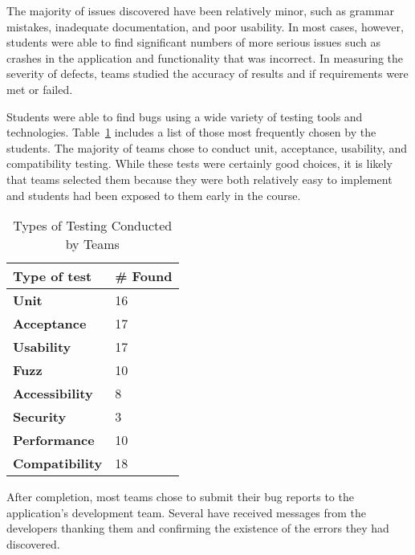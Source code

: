 \documentclass{sig-alternate}
\begin{document}
The majority of issues discovered have been relatively minor, such as grammar mistakes, inadequate documentation, and poor usability. In most cases, however, students were able to find significant numbers of more serious issues such as crashes in the application and functionality that was incorrect. In measuring the severity of defects, teams studied the accuracy of results and if requirements were met or failed.

Students were able to find bugs using a wide variety of testing tools and technologies. Table~\ref{table:typesoftesting} includes a list of those most frequently chosen by the students. The majority of teams chose to conduct unit, acceptance, usability, and compatibility testing. While these tests were certainly good choices, it is likely that teams selected them because they were both relatively easy to implement and students had been exposed to them early in the course.

\begin{table}[h!]
\caption{Types of Testing Conducted by Teams}
\begin{center}
    \begin{tabular}{ l | l }
    \toprule

	\bfseries Type of test & \bfseries \# Found  \\ \hline \hline
	\bfseries Unit & 16 \\ \hline
	\bfseries Acceptance & 17 \\ \hline
	\bfseries Usability & 17 \\ \hline
	\bfseries Fuzz & 10 \\ \hline
	\bfseries Accessibility & 8 \\ \hline
	\bfseries Security & 3 \\ \hline
	\bfseries Performance & 10 \\ \hline
	\bfseries Compatibility & 18 \\ \hline

    \end{tabular}
\end{center}

\label{table:typesoftesting}
\end{table}

After completion, most teams chose to submit their bug reports to the application's development team. Several have received messages from the developers thanking them and confirming the existence of the errors they had discovered.
\end{document}
